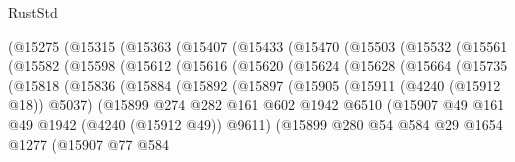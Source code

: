\begin{lexlean}{RustStd}
\begin{coremodule}
{\begin{coremodule}
{{{{{{{{{{{{{{{{{{{{{{{{{{{{{{{{{{{        (@15275
          (@15315
            (@15363
              (@15407
                (@15433
                  (@15470
                    (@15503
                      (@15532
                        (@15561
                          (@15582
                            (@15598
                              (@15612
                                (@15616
                                  (@15620
                                    (@15624
                                      (@15628
                                        (@15664
                                          (@15735
                                            (@15818
                                              (@15836
                                                (@15884
                                                  (@15892
                                                    (@15897
                                                      (@15905
                                                        (@15911 (@4240 (@15912 @18)) @5037)
                                                        (@15899
                                                          @274
                                                          @282
                                                          @161
                                                          @602
                                                          @1942
                                                          @6510
                                                          (@15907
                                                            @49
                                                            @161
                                                            @49
                                                            @1942
                                                            (@4240 (@15912 @49))
                                                            @9611)
                                                          (@15899
                                                            @280
                                                            @54
                                                            @584
                                                            @29
                                                            @1654
                                                            @1277
                                                            (@15907
                                                              @77
                                                              @584
}}}}}}}}}}}}}}}}}}}}}}}}}}}}}}}}}}}
\end{coremodule}}
\end{coremodule}
\end{lexlean}
